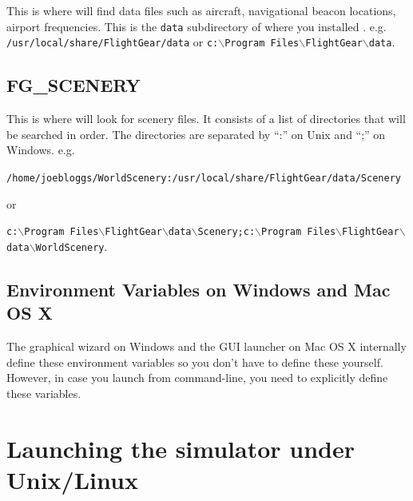 This is where \FlightGear{} will find data files such as aircraft, navigational
beacon locations, airport frequencies. This is the \texttt{data} subdirectory
of where you installed \FlightGear{}. e.g.
\texttt{/usr/local/share/FlightGear/data} or
\texttt{c:$\backslash$Program Files$\backslash$FlightGear$\backslash$data}.

\subsection{FG\_SCENERY}

This is where \FlightGear{} will look for scenery files. It consists of a list
of directories that will be searched in order. The directories are separated
by ``:'' on Unix and ``;'' on Windows. e.g.

\noindent
{\footnotesize{\texttt{/home/joebloggs/WorldScenery:/usr/local/share/FlightGear/data/Scenery}}}

\noindent
or

\noindent
{\footnotesize{\texttt{c:$\backslash$Program Files$\backslash$FlightGear$\backslash$data$\backslash$Scenery;c:$\backslash$Program Files$\backslash$FlightGear$\backslash$data$\backslash$WorldScenery}}}.

\subsection{Environment Variables on Windows and Mac OS X}
The graphical wizard on Windows and the GUI launcher on Mac OS X internally
define these environment variables so you don't have to define these yourself.
However, in case you launch \FlightGear{} from command-line, you need to
explicitly define these variables.

\section{Launching the simulator under Unix/Linux}

\centerline{}
\smallskip

